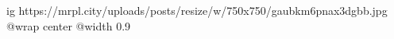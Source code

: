  
 
 
 
 

\ifcmt
  ig https://mrpl.city/uploads/posts/resize/w/750x750/gaubkm6pnax3dgbb.jpg
  @wrap center
  @width 0.9
\fi
